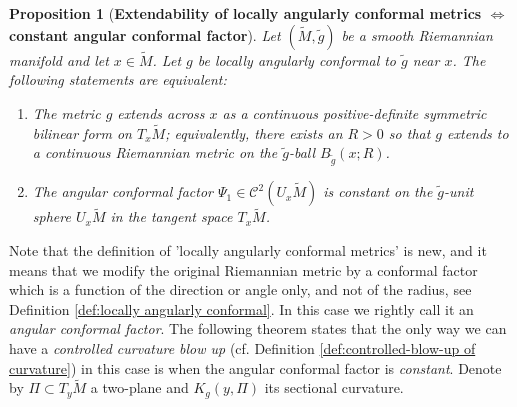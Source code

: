 \documentclass{amsart}
\newtheorem{proposition}[theorem]{Proposition}
\theoremstyle{definition}
\theoremstyle{remark}
\newcommand{\cl}{\mathbb{R}}
\newcommand{\0}{\boldsymbol{0}}
\def\cC{\mathcal C}
\begin{document}
 \begin{proposition}[\textbf{Extendability of locally angularly conformal metrics $\Leftrightarrow$ constant angular conformal factor}]\label{prop:extendability}
Let $(\widetilde M,\widetilde g)$ be a smooth Riemannian manifold and let $x\in\widetilde M$. Let $g$ be locally angularly conformal to $\tilde{g}$ near $x$. The following statements are equivalent:
\begin{enumerate}
    \item The metric $g$ extends across $x$ as a continuous positive-definite symmetric bilinear form on $T_x\widetilde M$; equivalently, there exists an $R>0$ so that $g$ extends to a continuous Riemannian metric on the $\tilde{g}$-ball $B_{\widetilde g}(x;R)$.
    \item The angular conformal factor $\Psi_1\in \cC^2(U_x\widetilde{M})$ is constant on the $\tilde{g}$-unit sphere $U_x\widetilde M$ in the tangent space $T_x\widetilde M$.
\end{enumerate}
\end{proposition}

Note that the definition of 'locally angularly conformal metrics' is new, and it means that we modify the original Riemannian metric by a conformal factor which is a function of the direction or angle only, and not of the radius, see Definition \ref{def:locally angularly conformal}. In this case we rightly call it an \textit{angular conformal factor}. The following theorem states that the only way we can have a \textit{controlled curvature blow up} (cf. Definition \ref{def:controlled-blow-up of curvature}) in this case is when the angular conformal factor is\textit{ constant}. Denote by $\Pi\subset T_y\widetilde M$ a two-plane and $K_g(y,\Pi)$ its sectional curvature.
\end{document}
